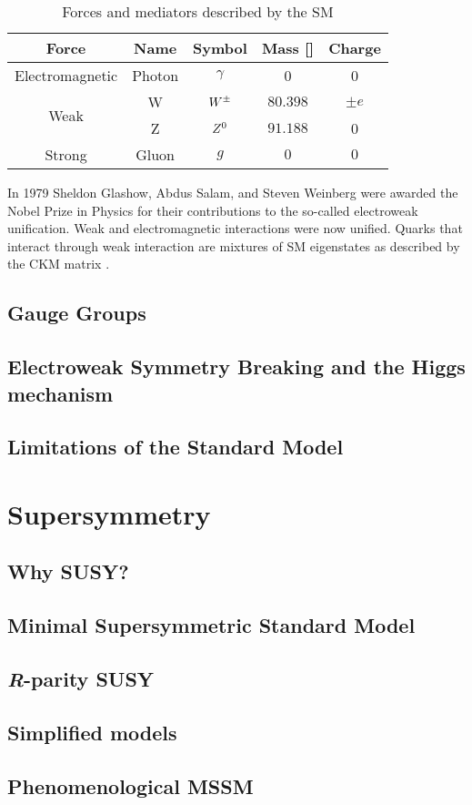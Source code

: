 				\begin{table}[!htb]\centering\caption{Forces and mediators described by the SM}							
					\begin{tabular}{c|c|c|c|c}
						\hline \hline
						Force & Name & Symbol & Mass [\GeV]& Charge \\ \hline \hline
						Electromagnetic & Photon & $\gamma$ & 0 & 0 \\ \hline
						\multirow{2}{*}{Weak} & W & $W^{\pm}$ & $80.398$ & $\pm e$ \\
						& Z & $Z^0$ & $91.188$ & 0 \\\hline
						Strong & Gluon & $g$ & $0$ & $0$ \\\hline\hline
					\end{tabular}						
				\label{tab:interactions} 
				\end{table}

				In 1979 Sheldon Glashow, Abdus Salam, and Steven Weinberg were awarded the Nobel Prize in Physics for their contributions to the so-called electroweak unification. Weak and electromagnetic interactions were now unified. Quarks that interact through weak interaction are mixtures of SM eigenstates as described by the CKM matrix \cite{Olive2014}. 


			\subsection*{Gauge Groups}




			\subsection*{Electroweak Symmetry Breaking and the Higgs mechanism}




		\subsection{Limitations of the Standard Model}
		\label{sec:SMlim}





	\section{Supersymmetry}
	\label{sec:SUSY}

		\subsection{Why SUSY?}

		\subsection{Minimal Supersymmetric Standard Model}

		\subsection{\emph{R}-parity SUSY}
		
		\subsection{Simplified models}

		\subsection{Phenomenological MSSM}
